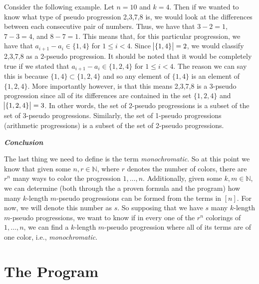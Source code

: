 \documentclass[12pt, a4paper]{article}
\begin{document}
\vspace{2mm}
Consider the following example. Let $n=10$ and $k=4$. Then if we wanted to know what type of pseudo progression 2,3,7,8 is, we would look at the differences between each consecutive pair of numbers. Thus, we have that $3-2=1$, $7-3=4$, and $8-7=1$. This means that, for this particular progression, we have that $a_{i+1}-a_i\in\{1,4\}$ for $1\leq i<4$. Since $\abs{\{1,4\}}=2$, we would classify 2,3,7,8 as a $2$-pseudo progression. It should be noted that it would be completely true if we stated that $a_{i+1}-a_i\in\{1,2,4\}$ for $1\leq i<4$. The reason we can say this is because $\{1,4\}\subset\{1,2,4\}$ and so any element of $\{1,4\}$ is an element of $\{1,2,4\}$. More importantly however, is that this means 2,3,7,8 is a 3-pseudo progression since all of its differences are contained in the set $\{1,2,4\}$ and $\abs{\{1,2,4\}}=3$. In other words, the set of 2-pseudo progressions is a subset of the set of 3-pseudo progressions. Similarly, the set of 1-pseudo progressions (arithmetic progressions) is a subset of the set of 2-pseudo progressions.

\vspace{6mm}

\noindent\textit{\textbf{Conclusion}}

\vspace{2mm}

The last thing we need to define is the term \textit{monochromatic}. So at this point we know that given some $n,r\in\mathbb{N}$, where $r$ denotes the number of colors, there are $r^n$ many ways to color the progression $1,\dots,n$. Additionally, given some $k,m\in\mathbb{N}$, we can determine (both through the a proven formula and the program) how many $k$-length $m$-pseudo progressions can be formed from the terms in $[n]$. For now, we will denote this number as $s$. So supposing that we have $s$ many $k$-length $m$-pseudo progressions, we want to know if in every one of the $r^n$ colorings of $1,\dots,n$, we can find a $k$-length $m$-pseudo progression where all of its terms are of one color, i.e., \textit{monochromatic}.

\section{The Program}
\end{document}
